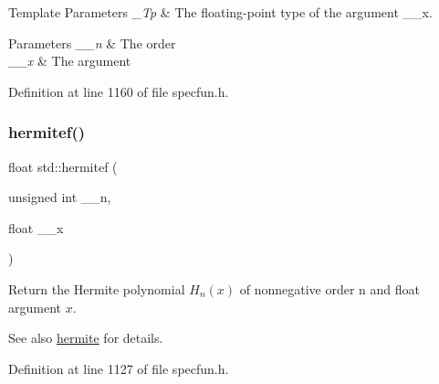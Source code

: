 \begin{DoxyTemplParams}{Template Parameters}
{\em \+\_\+\+Tp} & The floating-\/point type of the argument {\ttfamily \+\_\+\+\_\+x}. \\
\hline
\end{DoxyTemplParams}

\begin{DoxyParams}{Parameters}
{\em \+\_\+\+\_\+n} & The order \\
\hline
{\em \+\_\+\+\_\+x} & The argument \\
\hline
\end{DoxyParams}


Definition at line 1160 of file specfun.\+h.

\mbox{\label{group__cxx17__math__spec__func_ga94dae7444bb349e33057a92932db8abe}} 
\subsubsection{\texorpdfstring{hermitef()}{hermitef()}}
{\footnotesize\ttfamily float std\+::hermitef (\begin{DoxyParamCaption}\item[{unsigned int}]{\+\_\+\+\_\+n,  }\item[{float}]{\+\_\+\+\_\+x }\end{DoxyParamCaption})\hspace{0.3cm}{\ttfamily [inline]}}

Return the Hermite polynomial $ H_n(x) $ of nonnegative order n and float argument $ x $.

\begin{DoxySeeAlso}{See also}
\hyperlink{group__cxx17__math__spec__func_ga8bd1626f1e3f7256c4fd13579f881183}{hermite} for details. 
\end{DoxySeeAlso}


Definition at line 1127 of file specfun.\+h.

\mbox{\label{group__cxx17__math__spec__func_ga21f8e312ee3e65286f86bf141b0f32e0}} 
